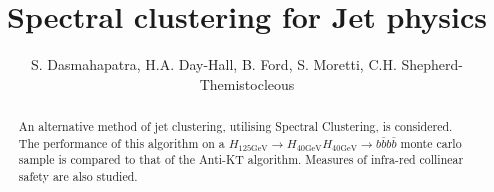 \documentclass{article}
\begin{document}
\title{Spectral clustering for Jet physics}
\author{S. Dasmahapatra, H.A. Day-Hall, B. Ford, S. Moretti, C.H. Shepherd-Themistocleous}
	
	\maketitle
	
    \FloatBarrier
    \begin{abstract}
        An alternative method of jet clustering, utilising Spectral Clustering, is considered.
        The performance of this algorithm on a \(H_{125\text{GeV}} \rightarrow H_{40\text{GeV}} H_{40\text{GeV}} \rightarrow b \bar{b} b \bar{b}\)
        monte carlo sample is compared to that of the Anti-KT algorithm.
        Measures of infra-red collinear safety are also studied.
	\end{abstract}
     
    \FloatBarrier
    \FloatBarrier
    
    \FloatBarrier
    
    \FloatBarrier
    
    \FloatBarrier
    
    \FloatBarrier
    \printbibliography	
\end{document}
